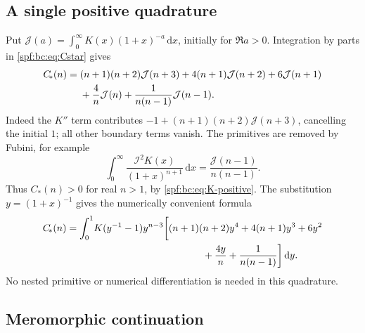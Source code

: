 \documentclass[11pt]{article}
\numberwithin{equation}{section}
\theoremstyle{definition}
\theoremstyle{remark}
\theoremstyle{definition}
\newcommand{\bcC}{C_{\!*}}
\newcommand{\bcI}{\mathcal I}
\begin{document}
\subsection{A single positive quadrature}

Put $\mathcal J(a)=\int_0^\infty K(x)(1+x)^{-a}\,\mathrm d x$, initially for $\Re a>0$.
Integration by parts in \eqref{spf:bc:eq:Cstar} gives
\begin{align}
 \bcC(n)={}&(n+1)(n+2)\mathcal J(n+3)+4(n+1)\mathcal J(n+2)+6\mathcal J(n+1)\notag\\
          &+\frac4n\mathcal J(n)+\frac1{n(n-1)}\mathcal J(n-1).
 \label{spf:bc:eq:Jformula}
\end{align}
Indeed the $K''$ term contributes $-1+(n+1)(n+2)\mathcal J(n+3)$, cancelling the
initial $1$; all other boundary terms vanish. The primitives are removed by
Fubini, for example
\[
 \int_0^\infty\frac{\bcI^2K(x)}{(1+x)^{n+1}}\,\mathrm d x
 =\frac{\mathcal J(n-1)}{n(n-1)}.
\]
Thus $\bcC(n)>0$ for real $n>1$, by \eqref{spf:bc:eq:K-positive}. The substitution
$y=(1+x)^{-1}$ gives the numerically convenient formula
\begin{align}
 \bcC(n)=\int_0^1 &K(y^{-1}-1)y^{n-3}\biggl[
 (n+1)(n+2)y^4+4(n+1)y^3+6y^2\notag\\
 &\hspace{39mm}+\frac{4y}{n}+\frac1{n(n-1)}\biggr]\,\mathrm d y.
 \label{spf:bc:eq:quadrature}
\end{align}
No nested primitive or numerical differentiation is needed in this quadrature.

\subsection{Meromorphic continuation}
\end{document}
